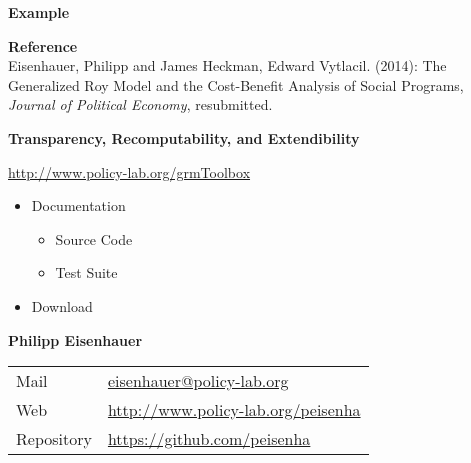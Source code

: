 \begin{frame} 
\begin{center}\textbf{\huge Example}\end{center}
\end{frame}


\begin{frame}\begin{center}
	
	\textbf{Reference}\\\vspace{0.3cm}
    Eisenhauer, Philipp and James Heckman, Edward Vytlacil. (2014): The Generalized Roy Model and the Cost-Benefit Analysis of Social Programs, \textit{Journal of Political Economy}, resubmitted.
    \end{center}
\end{frame}
\begin{frame}
\textbf{Transparency, Recomputability, and Extendibility}

\begin{center}\Large
\href{http://www.policy-lab.org/grmToolbox}{http://www.policy-lab.org/grmToolbox}
\end{center}

\begin{itemize}
\item Documentation\vspace{0.2cm}
\begin{itemize}
\item Source Code\vspace{0.2cm}
\item Test Suite\vspace{0.2cm}
\end{itemize}
\item Download
\end{itemize}

\end{frame}
\begin{frame}

\textbf{Philipp Eisenhauer}\vspace{0.5cm}
\begin{tabular}{ll}
Mail        & \href{mailto:eisenhauer@policy-lab.org}{eisenhauer@policy-lab.org}\\
Web         & \url{http://www.policy-lab.org/peisenha} \\
Repository  & \url{https://github.com/peisenha}\\
\end{tabular}

\end{frame}